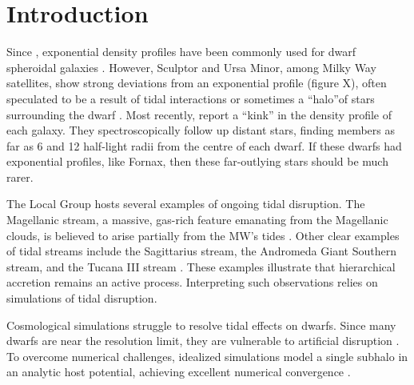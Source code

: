 \documentclass{aa}
\begin{document}
   \maketitle


\section{Introduction}

Since \citet{faber+lin1983}, exponential density profiles have been commonly used for dwarf
spheroidal galaxies \citealt{binggeli+sandage+tarenghi1984, mateo1998, mcconnachie+irwin2006, cicuendez+2018, kowalczyk+2013, martin+2016, MV2020a, battaglia+2022}.
However, Sculptor and Ursa Minor, among Milky Way satellites, show strong deviations from an exponential profile (figure X), often speculated to be a result of tidal interactions
\citep[e.g.,][]{innanen+papp1979, exkridge1988, IH1995, martinez-delgado+2001, walcher+2003, palma+2003} or sometimes a ``halo''of stars
surrounding the dwarf \citep{westfall+2006}.
Most recently, \citet{sestito+2023a, sestito+2023b} report a
``kink'' in the density profile of each galaxy. They spectroscopically
follow up distant stars, finding members as far as 6 and 12 half-light
radii from the centre of each dwarf. If these dwarfs had exponential
profiles, like Fornax, then these far-outlying stars should be much
rarer.

The Local Group hosts several examples of ongoing tidal disruption. The
Magellanic stream, a massive, gas-rich feature emanating from the
Magellanic clouds, is believed to arise partially from the MW's tides
\citep{putman+1998, diaz+bekki2012, donghia+fox2016}. Other clear
examples of tidal streams include the Sagittarius stream, the Andromeda
Giant Southern stream, and the Tucana III stream
\citep[e.g.,][]{ibata+gilmore+irwin1994, ibata+2001, li+2018}. These
examples illustrate that hierarchical accretion remains an active
process. Interpreting such observations relies on simulations of tidal
disruption.

Cosmological simulations struggle to resolve tidal effects on dwarfs.
Since many dwarfs are near the resolution limit, they are vulnerable to
artificial disruption
\citep[e.g.,][]{vandenbosch+2018, santos-santos+2025}. To overcome
numerical challenges, idealized simulations model a single subhalo in an
analytic host potential, achieving excellent numerical convergence \citep[e.g.,][]{hayashi+2003, bullock+johnston2005, klimentowski+2009, ogiya+2019}.
\end{document}
